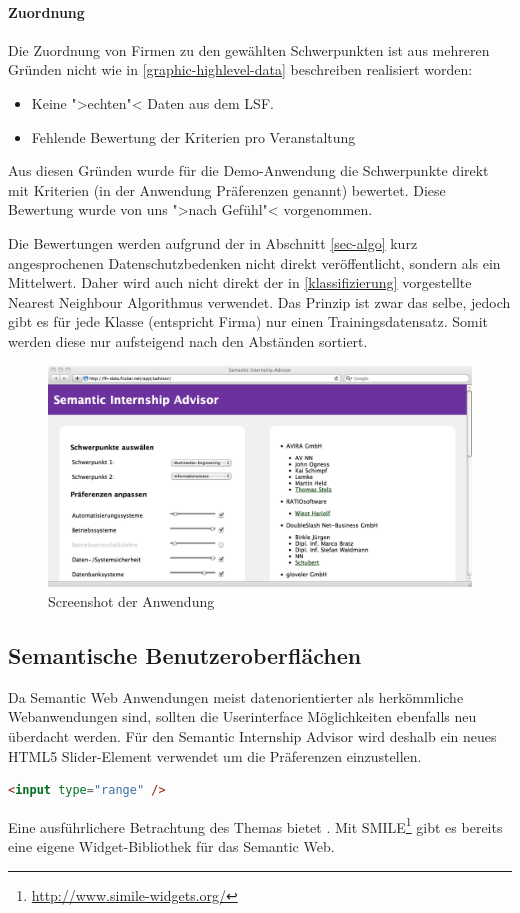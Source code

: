 \paragraph{Zuordnung} Die Zuordnung von Firmen zu den gewählten Schwerpunkten ist aus mehreren Gründen nicht wie in \ref{graphic-highlevel-data} beschreiben realisiert worden:
\begin{itemize}
 \item Keine ">echten"< Daten aus dem LSF.
 \item Fehlende Bewertung der Kriterien pro Veranstaltung
\end{itemize}

Aus diesen Gründen wurde für die Demo-Anwendung die Schwerpunkte direkt mit Kriterien (in der Anwendung Präferenzen genannt) bewertet. Diese Bewertung wurde von uns ">nach Gefühl"< vorgenommen.

Die Bewertungen werden aufgrund der in Abschnitt \ref{sec-algo} kurz angesprochenen Datenschutzbedenken nicht direkt veröffentlicht, sondern als ein Mittelwert. Daher wird auch nicht direkt der in \ref{klassifizierung} vorgestellte Nearest Neighbour Algorithmus verwendet. Das Prinzip ist zwar das selbe, jedoch gibt es für jede Klasse (entspricht Firma) nur einen Trainingsdatensatz. Somit werden diese nur aufsteigend nach den Abständen sortiert.

\begin{figure}[htbp]
	\centering
	\includegraphics[scale=0.39]{images/sia.png}
	\caption{Screenshot der Anwendung }
	\label{sia-screenshot}
\end{figure}


\subsection{Semantische Benutzeroberflächen}
Da Semantic Web Anwendungen meist datenorientierter als herkömmliche Webanwendungen sind, sollten die Userinterface Möglichkeiten ebenfalls neu überdacht werden.
Für den Semantic Internship Advisor wird deshalb ein neues HTML5 Slider-Element verwendet um die Präferenzen einzustellen.
\begin{lstlisting}[language=HTML,caption=HTML 5 Slider,stepnumber=1,label=umsetzung-html5-slider]
<input type="range" />
\end{lstlisting}
Eine ausführlichere Betrachtung des Themas bietet \cite{Aufr08}.
Mit SMILE\footnote{\url{http://www.simile-widgets.org/}} gibt es bereits eine eigene Widget-Bibliothek für das Semantic Web.


